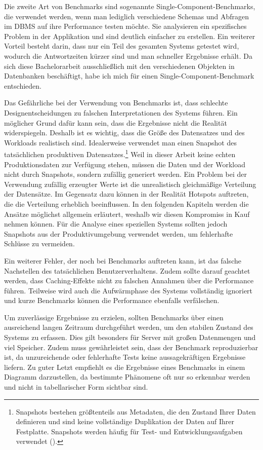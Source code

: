 Die zweite Art von Benchmarks sind sogenannte Single-Component-Benchmarks, die verwendet werden, wenn man lediglich verschiedene Schemas und Abfragen im DBMS auf ihre Performance testen möchte.
Sie analysieren ein spezifisches Problem in der Applikation und sind deutlich einfacher zu erstellen.
Ein weiterer Vorteil besteht darin, dass nur ein Teil des gesamten Systems getestet wird, wodurch die Antwortzeiten kürzer sind und man schneller Ergebnisse erhält.
Da sich diese Bachelorarbeit ausschließlich mit den verschiedenen Objekten in Datenbanken beschäftigt, habe ich mich für einen Single-Component-Benchmark entschieden.

Das Gefährliche bei der Verwendung von Benchmarks ist, dass schlechte Designentscheidungen zu falschen Interpretationen des Systems führen.
Ein möglicher Grund dafür kann sein, dass die Ergebnisse nicht die Realität widerspiegeln.
Deshalb ist es wichtig, dass die Größe des Datensatzes und des Workloads realistisch sind.
Idealerweise verwendet man einen Snapshot des tatsächlichen produktiven Datensatzes.\footnote{Snapshots bestehen größtenteils aus Metadaten, die den Zustand Ihrer Daten definieren und sind keine vollständige Duplikation der Daten auf Ihrer Festplatte. Snapshots werden häufig für Test- und Entwicklungsaufgaben verwendet (\cite{snapshot}).}
Weil in dieser Arbeit keine echten Produktionsdaten zur Verfügung stehen, müssen die Daten und der Workload nicht durch Snapshots, sondern zufällig generiert werden.
Ein Problem bei der Verwendung zufällig erzeugter Werte ist die unrealistisch gleichmäßige Verteilung der Datensätze.
Im Gegensatz dazu können in der Realität Hotspots auftreten, die die Verteilung erheblich beeinflussen.
In den folgenden Kapiteln werden die Ansätze möglichst allgemein erläutert, weshalb wir diesen Kompromiss in Kauf nehmen können.
Für die Analyse eines speziellen Systems sollten jedoch Snapshots aus der Produktivumgebung verwendet werden, um fehlerhafte Schlüsse zu vermeiden.

Ein weiterer Fehler, der noch bei Benchmarks auftreten kann, ist das falsche Nachstellen des tatsächlichen Benutzerverhaltens.
Zudem sollte darauf geachtet werden, dass Caching-Effekte nicht zu falschen Annahmen über die Performance führen.
Teilweise wird auch die Aufwärmphase des Systems vollständig ignoriert und kurze Benchmarks können die Performance ebenfalls verfälschen.

Um zuverlässige Ergebnisse zu erzielen, sollten Benchmarks über einen ausreichend langen Zeitraum durchgeführt werden, um den stabilen Zustand des Systems zu erfassen.
Dies gilt besonders für Server mit großen Datenmengen und viel Speicher.
Zudem muss gewährleistet sein, dass der Benchmark reproduzierbar ist, da unzureichende oder fehlerhafte Tests keine aussagekräftigen Ergebnisse liefern.
Zu guter Letzt empfiehlt es die Ergebnisse eines Benchmarks in einem Diagramm darzustellen, da bestimmte Phänomene oft nur so erkennbar werden und nicht in tabellarischer Form sichtbar sind.

